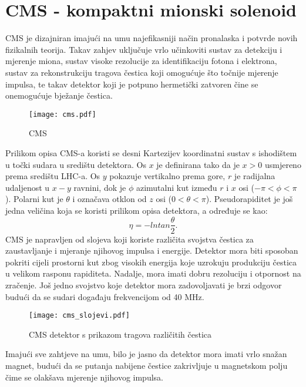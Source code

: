 \documentclass[a4paper,12pt]{report}
\begin{document}
\section{CMS - kompaktni mionski solenoid}
\label{ch:cms}
CMS je dizajniran imajući na umu najefikasniji način pronalaska i potvrde novih fizikalnih teorija. Takav zahjev uključuje vrlo učinkoviti  sustav za detekciju i mjerenje miona, sustav visoke rezolucije za identifikaciju fotona i elektrona, sustav za rekonstrukciju tragova čestica koji omogućuje što točnije mjerenje impulsa, te takav detektor koji je potpuno hermetički zatvoren čine se onemogućuje bježanje čestica.  
\begin{figure}%
\centering
\texttt{[image: cms.pdf]}%
\caption{CMS \cite{technical}}%
\label{cms}%
\end{figure}

Prilikom opisa CMS-a koristi se desni Kartezijev koordinatni sustav s ishodištem u točki sudara u središtu detektora. Os $x$ je definirana tako da je $x>0$ usmjereno prema središtu LHC-a.  Os  $y$ pokazuje vertikalno prema gore, $r$ je radijalna udaljenost u $x-y$ ravnini, dok je $\phi$ azimutalni kut između $r$ i $x$ osi ($-\pi < \phi < \pi$). Polarni kut je $\theta$ i označava otklon od $z$ osi ($0 < \theta < \pi$). Pseudorapiditet je još jedna veličina koja se koristi prilikom opisa detektora, a određuje se kao:
\begin{equation}
\eta= - ln tan \frac{\theta}{2}.
\label{pseudorapiditet}
\end{equation}
CMS je napravljen od slojeva koji koriste različita svojstva čestica  za zaustavljanje i mjeranje njihovog impulsa i energije.  Detektor mora biti sposoban pokriti cijeli prostorni kut zbog visokih energija koje uzrokuju produkciju čestica u velikom rasponu rapiditeta.  Nadalje, mora imati dobru rezoluciju i otpornost na zračenje.  Još jedno svojstvo koje detektor mora zadovoljavati je brzi odgovor budući da se sudari događaju frekvencijom od 40 MHz.   
\begin{figure}%
\centering
\texttt{[image: cms\_slojevi.pdf]}%
\caption{CMS detektor s prikazom tragova različitih čestica}%
\label{fig:cms_slojevi}%
\end{figure} 
Imajući sve zahtjeve na umu, bilo je jasno da detektor mora imati vrlo snažan magnet, budući da se putanja nabijene čestice zakrivljuje u magnetskom polju čime se olakšava mjerenje njihovog impulsa. 
\end{document}
